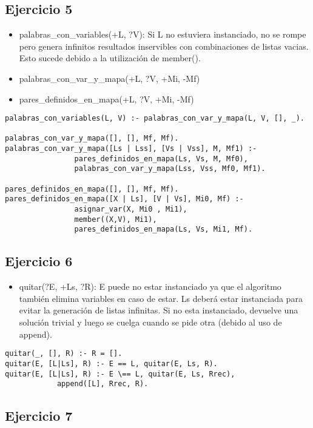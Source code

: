 \documentclass[spanish, 10pt,a4paper]{article}
\numberwithin{equation}{section} %
\begin{document}
\subsection{Ejercicio 5}

\begin{itemize}
\item palabras\_con\_variables(+L, ?V): Si L no estuviera instanciado, no se rompe pero genera infinitos resultados inservibles con combinaciones de listas vacias. Esto sucede debido a la utilización de member().
\item palabras\_con\_var\_y\_mapa(+L, ?V, +Mi, -Mf)
\item pares\_definidos\_en\_mapa(+L, ?V, +Mi, -Mf)
\end{itemize}
\begin{lstlisting}
palabras_con_variables(L, V) :- palabras_con_var_y_mapa(L, V, [], _).

palabras_con_var_y_mapa([], [], Mf, Mf).
palabras_con_var_y_mapa([Ls | Lss], [Vs | Vss], M, Mf1) :- 
				pares_definidos_en_mapa(Ls, Vs, M, Mf0), 
				palabras_con_var_y_mapa(Lss, Vss, Mf0, Mf1).

pares_definidos_en_mapa([], [], Mf, Mf).
pares_definidos_en_mapa([X | Ls], [V | Vs], Mi0, Mf) :-
				asignar_var(X, Mi0 , Mi1), 
				member((X,V), Mi1), 
				pares_definidos_en_mapa(Ls, Vs, Mi1, Mf).
\end{lstlisting}


\subsection{Ejercicio 6}

\begin{itemize}
\item quitar(?E, +Ls, ?R): E puede no estar instanciado ya que el algoritmo también elimina variables en caso de estar. Ls deberá estar instanciada para evitar la generación de 
listas infinitas. Si no esta instanciado, devuelve una solución trivial y luego se cuelga cuando se pide otra (debido al uso de append).
\end{itemize}
\begin{lstlisting}
quitar(_, [], R) :- R = [].
quitar(E, [L|Ls], R) :- E == L, quitar(E, Ls, R).
quitar(E, [L|Ls], R) :- E \== L, quitar(E, Ls, Rrec), 
			append([L], Rrec, R).
\end{lstlisting}


\subsection{Ejercicio 7}
\end{document}
